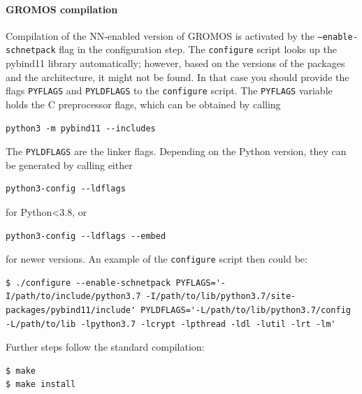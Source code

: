 \paragraph{GROMOS compilation}
Compilation of the NN-enabled version of GROMOS is activated by the \texttt{--enable-schnetpack} flag in the configuration step. The \texttt{configure} script looks up the pybind11 library automatically; however, based on the versions of the packages and the architecture, it might not be found. In that case you should provide the flags \texttt{PYFLAGS} and \texttt{PYLDFLAGS} to the \texttt{configure} script. The \texttt{PYFLAGS} variable holds the C preprocessor flags, which can be obtained by calling

\begin{lstlisting}[breaklines=true, breakatwhitespace=false]
python3 -m pybind11 --includes
\end{lstlisting}

The \texttt{PYLDFLAGS} are the linker flags. Depending on the Python version, they can be generated by calling either 

\begin{lstlisting}[breaklines=true, breakatwhitespace=false]
python3-config --ldflags
\end{lstlisting}

for Python<3.8, or 

\begin{lstlisting}[breaklines=true, breakatwhitespace=false]
python3-config --ldflags --embed
\end{lstlisting}

for newer versions. An example of the \texttt{configure} script then could be:
\begin{lstlisting}[breaklines=true, breakatwhitespace=false]
$ ./configure --enable-schnetpack PYFLAGS='-I/path/to/include/python3.7 -I/path/to/lib/python3.7/site-packages/pybind11/include' PYLDFLAGS='-L/path/to/lib/python3.7/config -L/path/to/lib -lpython3.7 -lcrypt -lpthread -ldl -lutil -lrt -lm'
\end{lstlisting}

Further steps follow the standard compilation:
\begin{lstlisting}[breaklines=true, breakatwhitespace=false]
$ make
$ make install
\end{lstlisting}


